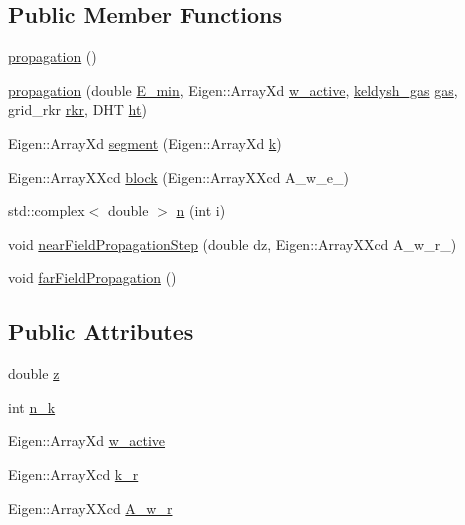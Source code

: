 \subsection*{Public Member Functions}
\begin{DoxyCompactItemize}
\item 
\hyperlink{classpropagation_a9d7b9f42ce1c0bc741d3016a07ba13f7}{propagation} ()
\item 
\hyperlink{classpropagation_a2580bb2332faef03bfb6d761ee55bb6d}{propagation} (double \hyperlink{classpropagation_ab5a753d760a135806a93b9082e8019fb}{E\+\_\+min}, Eigen\+::\+Array\+Xd \hyperlink{classpropagation_a4c24f42d4148eded469c6479d6bf1661}{w\+\_\+active}, \hyperlink{classkeldysh__gas}{keldysh\+\_\+gas} \hyperlink{classpropagation_a4152dc9a226a7ff91aff2338d0bd813f}{gas}, grid\+\_\+rkr \hyperlink{classpropagation_a3d37531bb5918f972544d242aec7e72b}{rkr}, D\+HT \hyperlink{classpropagation_a044544975e7fc2ec3df9a55d92f8cc90}{ht})
\item 
Eigen\+::\+Array\+Xd \hyperlink{classpropagation_a39126bbbd4977c140c0077b849e78bc1}{segment} (Eigen\+::\+Array\+Xd \hyperlink{classpropagation_a49a30e941421cd5e3f0b62bd1335a767}{k})
\item 
Eigen\+::\+Array\+X\+Xcd \hyperlink{classpropagation_af12b15d9b91f98516c0ff25efc1233d1}{block} (Eigen\+::\+Array\+X\+Xcd A\+\_\+w\+\_\+e\+\_\+)
\item 
std\+::complex$<$ double $>$ \hyperlink{classpropagation_a7c696d9e54e5f0a7735047e28aee4866}{n} (int i)
\item 
void \hyperlink{classpropagation_a65e272beb6b5b73f433456361bcde914}{near\+Field\+Propagation\+Step} (double dz, Eigen\+::\+Array\+X\+Xcd A\+\_\+w\+\_\+r\+\_\+)
\item 
void \hyperlink{classpropagation_a9c2e1cb4e314c173b26de08ffcfe071d}{far\+Field\+Propagation} ()
\end{DoxyCompactItemize}
\subsection*{Public Attributes}
\begin{DoxyCompactItemize}
\item 
double \hyperlink{classpropagation_aeacfc091fafd1fdb1af4536f6f587e55}{z}
\item 
int \hyperlink{classpropagation_a93033ee98c04a6fe007eae5c856e76b3}{n\+\_\+k}
\item 
Eigen\+::\+Array\+Xd \hyperlink{classpropagation_a4c24f42d4148eded469c6479d6bf1661}{w\+\_\+active}
\item 
Eigen\+::\+Array\+Xcd \hyperlink{classpropagation_a9e437271e452fa1732f50e006347b501}{k\+\_\+r}
\item 
Eigen\+::\+Array\+X\+Xcd \hyperlink{classpropagation_ad3a84addde67e43bbb606408193f78ee}{A\+\_\+w\+\_\+r}
\end{DoxyCompactItemize}

